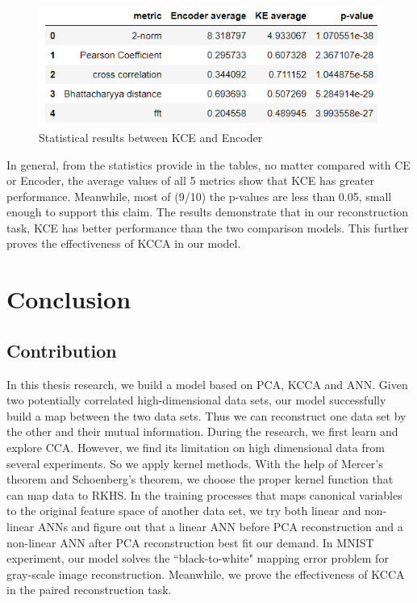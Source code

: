 \documentclass[12pt]{report} %
\begin{document}
\begin{figure}[H]
	\centering
	\includegraphics[scale=1.2]{pictures/KE-M2.png}
	\caption{Statistical results between KCE and Encoder}
	\label{fig:6}
\end{figure}
In general, from the statistics provide in the tables, no matter compared with CE or Encoder, the average values of all 5 metrics show that KCE has greater performance. Meanwhile, most of (9/10) the p-values are less than 0.05, small enough to support this claim. The results demonstrate that in our reconstruction task, KCE has better performance than the two comparison models. This further proves the effectiveness of KCCA in our model. 

\chapter{Conclusion}
\section{Contribution}
In this thesis research, we build a model based on PCA, KCCA and ANN. Given two potentially correlated high-dimensional data sets, our model successfully build a map between the two data sets. Thus we can reconstruct one data set by the other and their mutual information. During the research, we first learn and explore CCA. However, we find its limitation on high dimensional data from several experiments. So we apply kernel methods. With the help of Mercer's theorem and Schoenberg's theorem, we choose the proper kernel function that can map data to RKHS. In the training processes that maps canonical variables to the original feature space of another data set, we try both linear and non-linear ANNs and figure out that a linear ANN before PCA reconstruction and a non-linear ANN after PCA reconstruction best fit our demand. In MNIST experiment, our model solves the ``black-to-white" mapping error problem for gray-scale image reconstruction. Meanwhile, we prove the effectiveness of KCCA in the paired reconstruction task.
\end{document}
